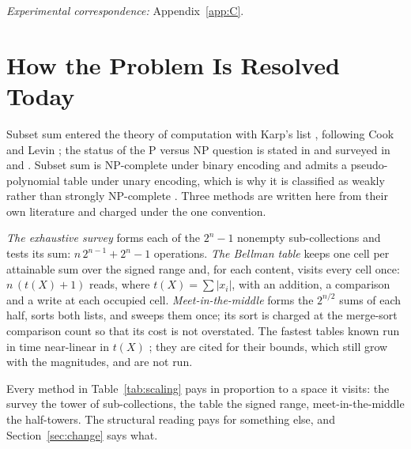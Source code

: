\documentclass[pdflatex,sn-mathphys-num]{sn-jnl}
\theoremstyle{thmstyleone}%
\theoremstyle{thmstyletwo}%
\theoremstyle{thmstylethree}%
\begin{document}
\noindent\emph{Experimental correspondence:} Appendix~\ref{app:C}.

\section{How the Problem Is Resolved Today}\label{sec:today}
Subset sum entered the theory of computation with Karp's list \citep{Karp1972}, following Cook \citep{Cook1971} and Levin \citep{Levin1973}; the status of the P versus NP question is stated in \citet{Cook2000} and surveyed in \citet{Fortnow2009} and \citet{Aaronson2016}. Subset sum is NP-complete under binary encoding and admits a pseudo-polynomial table under unary encoding, which is why it is classified as weakly rather than strongly NP-complete \citep{GareyJohnson1979,Papadimitriou1994,AroraBarak2009,Sipser2012}. Three methods are written here from their own literature and charged under the one convention.

\emph{The exhaustive survey} forms each of the $2^n-1$ nonempty sub-collections and tests its sum: $n\,2^{n-1}+2^n-1$ operations. \emph{The Bellman table} \citep{Bellman1957} keeps one cell per attainable sum over the signed range and, for each content, visits every cell once: $n\,(t(X)+1)$ reads, where $t(X)=\sum|x_i|$, with an addition, a comparison and a write at each occupied cell. \emph{Meet-in-the-middle} \citep{HorowitzSahni1974} forms the $2^{n/2}$ sums of each half, sorts both lists, and sweeps them once; its sort is charged at the merge-sort comparison count so that its cost is not overstated. The fastest tables known run in time near-linear in $t(X)$ \citep{KoiliarisXu2017,Bringmann2017}; they are cited for their bounds, which still grow with the magnitudes, and are not run.

\begin{table}[!htbp]
\centering
\caption{The three methods and the structural reading on a family of sampled assertions with distinct magnitudes, means over 25 assertions per row, operations under the one convention.}
\label{tab:scaling}
\small

\end{table}

Every method in Table~\ref{tab:scaling} pays in proportion to a space it visits: the survey the tower of sub-collections, the table the signed range, meet-in-the-middle the half-towers. The structural reading pays for something else, and Section~\ref{sec:change} says what.
\end{document}
